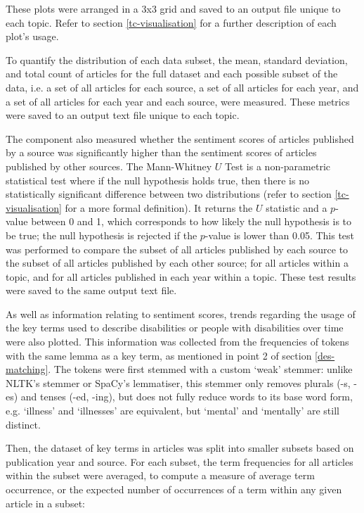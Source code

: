 \documentclass{report}
\begin{document}
These plots were arranged in a 3x3 grid and saved to an output file unique to each topic. 
Refer to section \ref{tc-visualisation} for a further description of each plot's usage.

To quantify the distribution of each data subset, the mean, standard deviation, and total count of articles for the full dataset and each possible subset of the data, i.e. a set of all articles for each source, a set of all articles for each year, and a set of all articles for each year and each source, were measured. 
These metrics were saved to an output text file unique to each topic.

The component also measured whether the sentiment scores of articles published by a source was significantly higher than the sentiment scores of articles published by other sources. 
The Mann-Whitney $U$ Test \cite{mann1947test} is a non-parametric statistical test where if the null hypothesis holds true, then there is no statistically significant difference between two distributions (refer to section \ref{tc-visualisation} for a more formal definition).
It returns the $U$ statistic and a $p$-value between 0 and 1, which corresponds to how likely the null hypothesis is to be true; the null hypothesis is rejected if the $p$-value is lower than 0.05.
This test was performed to compare the subset of all articles published by each source to the subset of all articles published by each other source; for all articles within a topic, and for all articles published in each year within a topic.
These test results were saved to the same output text file.

As well as information relating to sentiment scores, trends regarding the usage of the key terms used to describe disabilities or people with disabilities over time were also plotted.
This information was collected from the frequencies of tokens with the same lemma as a key term, as mentioned in point 2 of section \ref{des-matching}.
The tokens were first stemmed with a custom `weak' stemmer: unlike NLTK's stemmer or SpaCy's lemmatiser, this stemmer only removes plurals (-s, -es) and tenses (-ed, -ing), but does not fully reduce words to its base word form, e.g. `illness' and `illnesses' are equivalent, but `mental' and `mentally' are still distinct.

Then, the dataset of key terms in articles was split into smaller subsets based on publication year and source.
For each subset, the term frequencies for all articles within the subset were averaged, to compute a measure of average term occurrence, or the expected number of occurrences of a term within any given article in a subset:
\end{document}
